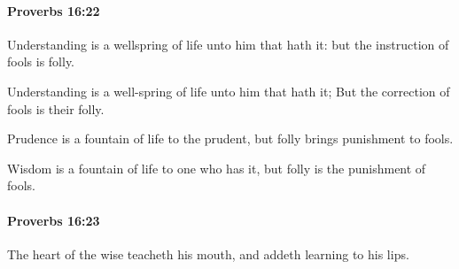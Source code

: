 		\paragraph{Proverbs 16:22} %
			\label{PROVERBS-16-22}

			Understanding is a wellspring of life unto him that hath it: but the instruction of fools is folly.

			\begin{versebox}
					\item[BHS] 
					\item[ASV] Understanding is a well-spring of life unto him that hath it; But the correction of fools is their folly.
					\item[NIV] Prudence is a fountain of life to the prudent, but folly brings punishment to fools.
					\item[NRSV] Wisdom is a fountain of life to one who has it, but folly is the punishment of fools.
			\end{versebox}

		\paragraph{Proverbs 16:23} %
			\label{PROVERBS-16-23}

			The heart of the wise teacheth his mouth, and addeth learning to his lips.

